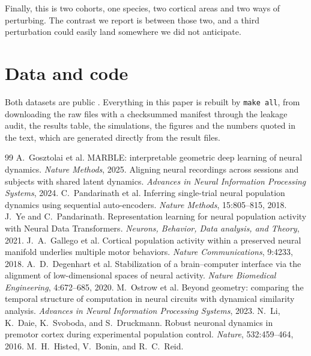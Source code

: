 \documentclass[11pt,letterpaper]{article}
\begin{document}
Finally, this is two cohorts, one species, two cortical areas and two ways of
perturbing. The contrast we report is between those two, and a third perturbation could
easily land somewhere we did not anticipate.

\section*{Data and code}

Both datasets are public \citep{alm_svoboda, icms_learning}. Everything in this paper is
rebuilt by
\texttt{make all}, from downloading the raw files with a checksummed manifest through
the leakage audit, the results table, the simulations, the figures and the numbers
quoted in the text, which are generated directly from the result files.

\begin{thebibliography}{99}\small
{} A.~Gosztolai et al.
MARBLE: interpretable geometric deep learning of neural dynamics.
\emph{Nature Methods}, 2025.
 Aligning neural recordings across
sessions and subjects with shared latent dynamics.
\emph{Advances in Neural Information Processing Systems}, 2024.
 C.~Pandarinath et al.
Inferring single-trial neural population dynamics using sequential auto-encoders.
\emph{Nature Methods}, 15:805--815, 2018.
 J.~Ye and C.~Pandarinath.
Representation learning for neural population activity with Neural Data Transformers.
\emph{Neurons, Behavior, Data analysis, and Theory}, 2021.
 J.~A.~Gallego et al.
Cortical population activity within a preserved neural manifold underlies multiple
motor behaviors. \emph{Nature Communications}, 9:4233, 2018.
 A.~D.~Degenhart et al.
Stabilization of a brain--computer interface via the alignment of low-dimensional
spaces of neural activity. \emph{Nature Biomedical Engineering}, 4:672--685, 2020.
 M.~Ostrow et al.
Beyond geometry: comparing the temporal structure of computation in neural circuits
with dynamical similarity analysis.
\emph{Advances in Neural Information Processing Systems}, 2023.
 N.~Li, K.~Daie, K.~Svoboda, and S.~Druckmann.
Robust neuronal dynamics in premotor cortex during experimental population control.
\emph{Nature}, 532:459--464, 2016.
 M.~H.~Histed, V.~Bonin, and R.~C.~Reid.

\end{thebibliography}
\end{document}
